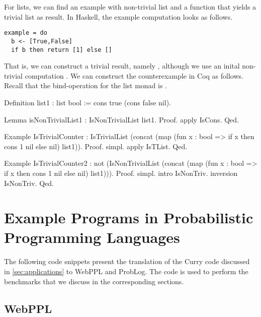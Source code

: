 For lists, we can find an example with non-trivial list and a function  that yields a trivial list as result.
In Haskell, the example computation looks as follows.

\begin{verbatim}
example = do
  b <- [True,False]
  if b then return [1] else []
\end{verbatim}

That is, we can construct a trivial result, namely , although we use an inital non-trivial computation .
We can construct the counterexample in Coq as follows.
Recall that the bind-operation for the list monad is .

\begin{coqcode}
Definition list1 : list bool := cons true (cons false nil).

Lemma isNonTrivialList1 : IsNonTrivialList list1.
Proof.
  apply IsCons.
Qed.

Example IsTrivialCounter :
  IsTrivialList
    (concat (map (fun x : bool => if x then cons 1 nil else nil) list1)).
Proof.
  simpl. apply IsTList.
Qed.

Example IsTrivialCounter2 :
  not (IsNonTrivialList
    (concat (map (fun x : bool => if x then cons 1 nil else nil) list1))).
Proof.
  simpl. intro IsNonTriv. inversion IsNonTriv.
Qed.
\end{coqcode}

\section{Example Programs in Probabilistic Programming Languages}
\label{sec:appendix:ppl}

The following code snippets present the translation of the Curry code discussed in \autoref{sec:applications} to WebPPL and ProbLog.
The code is used to perform the benchmarks that we discuss in the corresponding sections.

\subsection*{WebPPL}

